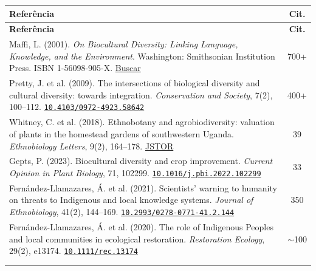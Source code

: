 \documentclass[a4paper,11pt]{article}
\newcommand{\doi}[1]{\href{https://doi.org/#1}{\texttt{#1}}}
\begin{document}
\begin{longtable}{>{\raggedright\arraybackslash}p{} c}
\toprule
\textbf{Referência} & \textbf{Cit.} \\
\midrule
\endfirsthead
\toprule
\textbf{Referência} & \textbf{Cit.} \\
\midrule
\endhead

Maffi, L. (2001). \textit{On Biocultural Diversity: Linking Language, Knowledge, and the Environment}. Washington: Smithsonian Institution Press. ISBN 1-56098-905-X.\newline
\href{https://www.google.com/search?q=Maffi+2001+On+Biocultural+Diversity+Smithsonian}{Buscar} & 700+ \\
\addlinespace

Pretty, J. et al. (2009). The intersections of biological diversity and cultural diversity: towards integration. \textit{Conservation and Society}, 7(2), 100--112.\newline
\doi{10.4103/0972-4923.58642} & 400+ \\
\addlinespace

Whitney, C. et al. (2018). Ethnobotany and agrobiodiversity: valuation of plants in the homestead gardens of southwestern Uganda. \textit{Ethnobiology Letters}, 9(2), 164--178.\newline
\href{https://www.jstor.org/stable/26551443}{JSTOR} & 39 \\
\addlinespace

Gepts, P. (2023). Biocultural diversity and crop improvement. \textit{Current Opinion in Plant Biology}, 71, 102299.\newline
\doi{10.1016/j.pbi.2022.102299} & 33 \\
\addlinespace

Fernández-Llamazares, Á. et al. (2021). Scientists' warning to humanity on threats to Indigenous and local knowledge systems. \textit{Journal of Ethnobiology}, 41(2), 144--169.\newline
\doi{10.2993/0278-0771-41.2.144} & 350 \\
\addlinespace

Fernández-Llamazares, Á. et al. (2020). The role of Indigenous Peoples and local communities in ecological restoration. \textit{Restoration Ecology}, 29(2), e13174.\newline
\doi{10.1111/rec.13174} & $\sim$100 \\

\addlinespace

\multicolumn{2}{l}{\textit{Singularidade territorial (componente de V2)}} \\
\addlinespace


\end{longtable}
\end{document}
